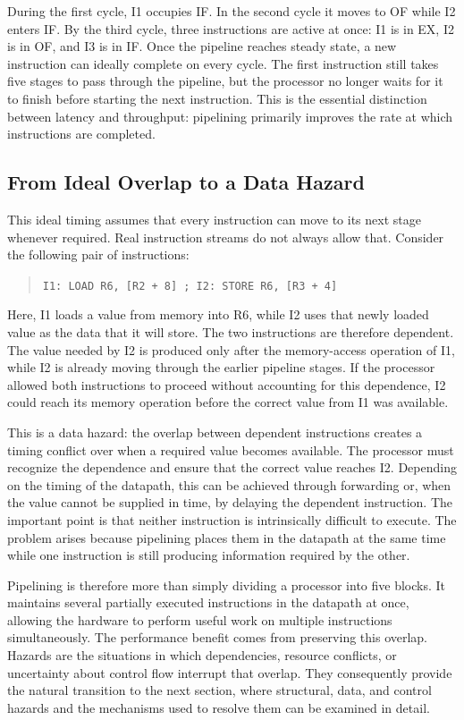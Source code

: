\documentclass[11pt,a4paper]{report}
\begin{document}
During the first cycle, I1 occupies IF. In the second cycle it moves to OF while I2 enters IF. By the third cycle, three instructions are active at once: I1 is in EX, I2 is in OF, and I3 is in IF. Once the pipeline reaches steady state, a new instruction can ideally complete on every cycle. The first instruction still takes five stages to pass through the pipeline, but the processor no longer waits for it to finish before starting the next instruction. This is the essential distinction between latency and throughput: pipelining primarily improves the rate at which instructions are completed.~\cite{marz-pipelining} ~\cite{hennessy}

\subsection{From Ideal Overlap to a Data Hazard}

This ideal timing assumes that every instruction can move to its next stage whenever required. Real instruction streams do not always allow that. Consider the following pair of instructions:

\begin{quote}
\texttt{I1: LOAD R6, [R2 + 8] \quad ; \quad I2: STORE R6, [R3 + 4]}
\end{quote}

Here, I1 loads a value from memory into R6, while I2 uses that newly loaded value as the data that it will store. The two instructions are therefore dependent. The value needed by I2 is produced only after the memory-access operation of I1, while I2 is already moving through the earlier pipeline stages. If the processor allowed both instructions to proceed without accounting for this dependence, I2 could reach its memory operation before the correct value from I1 was available.

This is a data hazard: the overlap between dependent instructions creates a timing conflict over when a required value becomes available. The processor must recognize the dependence and ensure that the correct value reaches I2. Depending on the timing of the datapath, this can be achieved through forwarding or, when the value cannot be supplied in time, by delaying the dependent instruction. The important point is that neither instruction is intrinsically difficult to execute. The problem arises because pipelining places them in the datapath at the same time while one instruction is still producing information required by the other.

Pipelining is therefore more than simply dividing a processor into five blocks. It maintains several partially executed instructions in the datapath at once, allowing the hardware to perform useful work on multiple instructions simultaneously. The performance benefit comes from preserving this overlap. Hazards are the situations in which dependencies, resource conflicts, or uncertainty about control flow interrupt that overlap. They consequently provide the natural transition to the next section, where structural, data, and control hazards and the mechanisms used to resolve them can be examined in detail.~\cite{marz-pipelining} ~\cite{hennessy}
\end{document}
